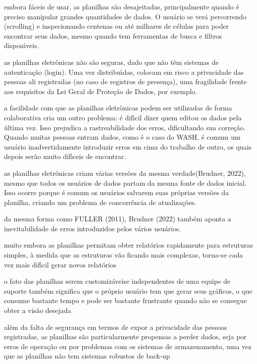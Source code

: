 \documentclass[
12pt,		%
openright,	%
twoside,  %
a4paper,			%
chapter=TITLE,		%
english,			%
french,				%
spanish,			%
brazil				%
]{USPSC-classe/USPSC}
\begin{document}
\begin{alineas}
\item embora f\'aceis de usar, as planilhas s\~ao desajeitadas, principalmente quando \'e preciso manipular grandes quantidades de dados. O usu\'ario se ver\'a percorrendo (scrolling) e inspecionando centenas ou at\'e milhares de c\'elulas para poder encontrar seus dados, mesmo quando tem ferramentas de busca e filtros dispon\'{\i}veis.
\item as planilhas eletr\^onicas n\~ao s\~ao seguras, dado que n\~ao t\^em sistemas de autentica\c{c}\~ao (login). Uma vez distribu\'{\i}das, colocam em risco a privacidade das pessoas ali registradas (no caso de registros de presen\c{c}a), uma fragilidade frente aos requisitos da Lei Geral de Prote\c{c}\~ao de Dados, por exemplo.
\item a facilidade com que as planilhas eletr\^onicas podem ser utilizadas de forma colaborativa cria um outro problema: \'e dif\'{\i}cil dizer quem editou os dados pela \'ultima vez. Isso prejudica a rastreabilidade dos erros, dificultando sua corre\c{c}\~ao. Quando muitas pessoas entram dados, como \'e o caso do WASH, \'e comum um usu\'ario inadvertidamente introduzir erros em cima do trabalho de outro, os quais depois ser\~ao muito dif\'{\i}ceis de encontrar.
\item as planilhas eletr\^onicas criam v\'arias vers\~oes da mesma \textquotedbl verdade\textquotedbl   (Brudner, 2022), mesmo que todos os usu\'arios de dados partam da mesma fonte de dados inicial. Isso ocorre porque \'e comum os usu\'arios salvarem suas pr\'oprias vers\~oes da planilha, criando um problema de concorr\^encia de atualiza\c{c}\~oes.
\item da mesma forma como  FULLER (2011),  Brudner (2022) tamb\'em aponta a inevitabilidade de erros introduzidos pelos v\'arios usu\'arios.
\item muito embora as planilhas permitam obter relat\'orios rapidamente para estruturas simples, \`a medida que as estruturas v\~ao ficando mais complexas, torna-se cada vez mais dif\'{\i}cil gerar novos relat\'orios
\item o fato das planilhas serem \textquotedbl customiz\'aveis\textquotedbl  e independentes de uma equipe de suporte tamb\'em significa que o pr\'oprio usu\'ario tem que gerar seus gr\'aficos, o que consume bastante tempo e pode ser bastante frustrante quando n\~ao se consegue obter a vis\~ao desejada
\item al\'em da falta de seguran\c{c}a em termos de expor a privacidade das pessoas registradas, as planilhas s\~ao particularmente propensas a perder dados, seja por erros de opera\c{c}\~ao ou por problemas com os sistemas de armazenamento, uma vez que as planilhas n\~ao tem sistemas robustos de \textquotedbl back-up\textquotedbl 

\end{alineas}
\end{document}
